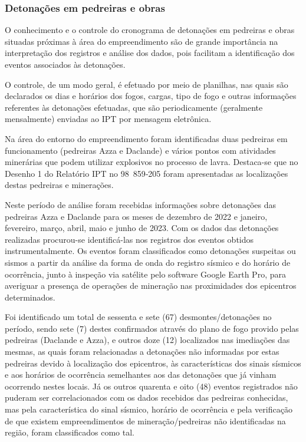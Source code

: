 \subsubsection{Detonações em pedreiras e obras}
\par{O conhecimento e o controle do cronograma de detonações em pedreiras e obras situadas próximas à área do empreendimento são de grande importância na interpretação dos registros e análise dos dados, pois facilitam a identificação dos eventos associados às detonações.}
\par{O controle, de um modo geral, é efetuado por meio de planilhas, nas quais são declarados os dias e horários dos fogos, cargas, tipo de fogo e outras informações referentes às detonações efetuadas, que são periodicamente (geralmente mensalmente) enviadas ao IPT por mensagem eletrônica.}
\par{Na área do entorno do empreendimento foram identificadas duas pedreiras em funcionamento (pedreiras Azza e Daclande) e vários pontos com atividades minerárias que podem utilizar explosivos no processo de lavra. Destaca-se que no Desenho 1 do Relatório IPT no 98 859‑205 foram apresentadas as localizações destas pedreiras e minerações.}
\par{Neste período de análise foram recebidas informações sobre detonações das pedreiras Azza e Daclande para os meses de dezembro de 2022 e janeiro, fevereiro, março, abril, maio e junho de 2023. Com os dados das detonações realizadas procurou-se identificá-las nos registros dos eventos obtidos instrumentalmente. Os eventos foram classificados como detonações suspeitas ou sismos a partir da análise da forma de onda do registro sísmico e do horário de ocorrência, junto à inspeção via satélite pelo software Google Earth Pro, para averiguar a presença de operações de mineração nas proximidades dos epicentros determinados.}
\par{Foi identificado um total de sessenta e sete (67) desmontes/detonações no período, sendo sete (7) destes confirmados através do plano de fogo provido pelas pedreiras (Daclande e Azza), e outros doze (12) localizados nas imediações das mesmas, as quais foram relacionadas a detonações não informadas por estas pedreiras devido à localização dos epicentros, às características dos sinais sísmicos e aos horários de ocorrência semelhantes aos das detonações que já vinham ocorrendo nestes locais. Já os outros quarenta e oito (48) eventos registrados não puderam ser correlacionados com os dados recebidos das pedreiras conhecidas, mas pela característica do sinal sísmico, horário de ocorrência e pela verificação de que existem empreendimentos de mineração/pedreiras não identificadas na região, foram classificados como tal.}
